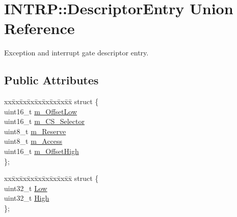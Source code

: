 \hypertarget{union_i_n_t_r_p_1_1_descriptor_entry}{}\section{I\+N\+T\+RP\+:\+:Descriptor\+Entry Union Reference}
\label{union_i_n_t_r_p_1_1_descriptor_entry}


Exception and interrupt gate descriptor entry.  


\subsection*{Public Attributes}
\begin{DoxyCompactItemize}
\item 
\begin{tabbing}
xx\=xx\=xx\=xx\=xx\=xx\=xx\=xx\=xx\=\kill
struct \{\\
\>uint16\_t \hyperlink{union_i_n_t_r_p_1_1_descriptor_entry_ad1b891ed37e3770aa5329ba8dc768cc7}{m\_OffsetLow}\\
\>uint16\_t \hyperlink{union_i_n_t_r_p_1_1_descriptor_entry_acc9a18e707a0396fa95b51e2737d172f}{m\_CS\_Selector}\\
\>uint8\_t \hyperlink{union_i_n_t_r_p_1_1_descriptor_entry_a47989742adb5c6d56c7d4bcf943770b5}{m\_Reserve}\\
\>uint8\_t \hyperlink{union_i_n_t_r_p_1_1_descriptor_entry_a431c102e5f096230dbe44160e7a611c1}{m\_Access}\\
\>uint16\_t \hyperlink{union_i_n_t_r_p_1_1_descriptor_entry_a9c62dca789f6a7c02513eb17f1a3de04}{m\_OffsetHigh}\\
\}; \\

\end{tabbing}\item 
\begin{tabbing}
xx\=xx\=xx\=xx\=xx\=xx\=xx\=xx\=xx\=\kill
struct \{\\
\>uint32\_t \hyperlink{union_i_n_t_r_p_1_1_descriptor_entry_ab3b735689731cd8b58ae8f9bf0f9fc42}{Low}\\
\>uint32\_t \hyperlink{union_i_n_t_r_p_1_1_descriptor_entry_a479e62ef6f3e27e03e121d965d6bab99}{High}\\
\}; \\

\end{tabbing}\end{DoxyCompactItemize}


